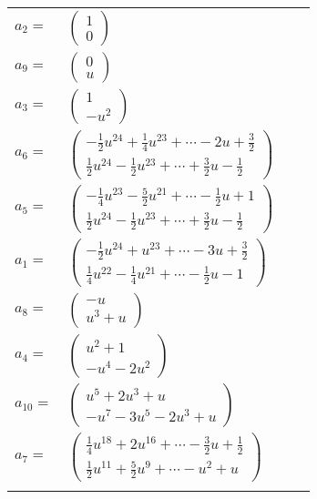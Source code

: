 \documentclass[1p]{elsarticle_modified}
\theoremstyle{definition}
\begin{document}
\begin{tabular}{m{7pt} m{180pt} m{7pt} m{180pt} }
\flushright $a_{2}=$&$\begin{pmatrix}1\\0\end{pmatrix}$ \\
\flushright $a_{9}=$&$\begin{pmatrix}0\\u\end{pmatrix}$ \\
\flushright $a_{3}=$&$\begin{pmatrix}1\\- u^2\end{pmatrix}$ \\
\flushright $a_{6}=$&$\begin{pmatrix}-\frac{1}{2} u^{24}+\frac{1}{4} u^{23}+\cdots-2 u+\frac{3}{2}\\\frac{1}{2} u^{24}-\frac{1}{2} u^{23}+\cdots+\frac{3}{2} u-\frac{1}{2}\end{pmatrix}$ \\
\flushright $a_{5}=$&$\begin{pmatrix}-\frac{1}{4} u^{23}-\frac{5}{2} u^{21}+\cdots-\frac{1}{2} u+1\\\frac{1}{2} u^{24}-\frac{1}{2} u^{23}+\cdots+\frac{3}{2} u-\frac{1}{2}\end{pmatrix}$ \\
\flushright $a_{1}=$&$\begin{pmatrix}-\frac{1}{2} u^{24}+u^{23}+\cdots-3 u+\frac{3}{2}\\\frac{1}{4} u^{22}-\frac{1}{4} u^{21}+\cdots-\frac{1}{2} u-1\end{pmatrix}$ \\
\flushright $a_{8}=$&$\begin{pmatrix}- u\\u^3+u\end{pmatrix}$ \\
\flushright $a_{4}=$&$\begin{pmatrix}u^2+1\\- u^4-2 u^2\end{pmatrix}$ \\
\flushright $a_{10}=$&$\begin{pmatrix}u^5+2 u^3+u\\- u^7-3 u^5-2 u^3+u\end{pmatrix}$ \\
\flushright $a_{7}=$&$\begin{pmatrix}\frac{1}{4} u^{18}+2 u^{16}+\cdots-\frac{3}{2} u+\frac{1}{2}\\\frac{1}{2} u^{11}+\frac{5}{2} u^9+\cdots- u^2+u\end{pmatrix}$\\&\end{tabular}
\end{document}
